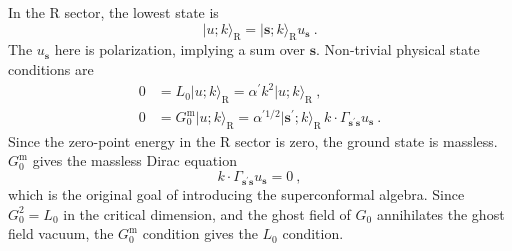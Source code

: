 	In the R sector, the lowest state is
	\begin{equation}
		\lvert u;k\rangle_{\text{R}} = \lvert\mathbf{s};k\rangle_{\text{R}} u_{\mathbf{s}} \:. \label{10.5.12}
	\end{equation}
	The $u_{\mathbf{s}}$ here is polarization, implying a sum over $\mathbf{s}$. Non-trivial physical state conditions are
	\begin{subequations}
		\begin{align}
			0 &= L_{0}\lvert u;k\rangle_{\text{R}} = \alpha^{\prime}k^{2}\lvert u;k\rangle_{\text{R}} \:, \label{10.5.13a}\\
			0 &= G_{0}^{\text{m}}\lvert u;k\rangle_{\text{R}}
			=\alpha^{\prime 1/2} \lvert \mathbf{s}^{\prime};k\rangle_{\text{R}}\, k\cdot \Gamma_{\mathbf{s}^{\prime}\mathbf{s}} u_{\mathbf{s}} \:. \label{10.5.13b}
		\end{align} \label{10.5.13}
	\end{subequations}
	Since the zero-point energy in the R sector is zero, the ground state is massless. $G_{0}^{\text{m}}$ gives the massless Dirac equation
	\begin{equation}
		k\cdot \Gamma_{\mathbf{s}^{\prime}\mathbf{s}} u_{\mathbf{s}} =0\:, \label{10.5.14}
	\end{equation}
	which is the original goal of introducing the superconformal algebra. Since $G_{0}^{2} = L_{0}$ in the critical dimension, and the ghost field of $G_{0}$ annihilates the ghost field vacuum, the $G_{0}^{\text{m}}$ condition gives the $L_{0}$ condition. 
	
